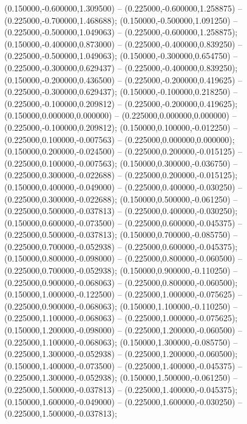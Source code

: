  (0.150000,-0.600000,1.309500) -- (0.225000,-0.600000,1.258875) -- (0.225000,-0.700000,1.468688);
 (0.150000,-0.500000,1.091250) -- (0.225000,-0.500000,1.049063) -- (0.225000,-0.600000,1.258875);
 (0.150000,-0.400000,0.873000) -- (0.225000,-0.400000,0.839250) -- (0.225000,-0.500000,1.049063);
 (0.150000,-0.300000,0.654750) -- (0.225000,-0.300000,0.629437) -- (0.225000,-0.400000,0.839250);
 (0.150000,-0.200000,0.436500) -- (0.225000,-0.200000,0.419625) -- (0.225000,-0.300000,0.629437);
 (0.150000,-0.100000,0.218250) -- (0.225000,-0.100000,0.209812) -- (0.225000,-0.200000,0.419625);
 (0.150000,0.000000,0.000000) -- (0.225000,0.000000,0.000000) -- (0.225000,-0.100000,0.209812);
 (0.150000,0.100000,-0.012250) -- (0.225000,0.100000,-0.007563) -- (0.225000,0.000000,0.000000);
 (0.150000,0.200000,-0.024500) -- (0.225000,0.200000,-0.015125) -- (0.225000,0.100000,-0.007563);
 (0.150000,0.300000,-0.036750) -- (0.225000,0.300000,-0.022688) -- (0.225000,0.200000,-0.015125);
 (0.150000,0.400000,-0.049000) -- (0.225000,0.400000,-0.030250) -- (0.225000,0.300000,-0.022688);
 (0.150000,0.500000,-0.061250) -- (0.225000,0.500000,-0.037813) -- (0.225000,0.400000,-0.030250);
 (0.150000,0.600000,-0.073500) -- (0.225000,0.600000,-0.045375) -- (0.225000,0.500000,-0.037813);
 (0.150000,0.700000,-0.085750) -- (0.225000,0.700000,-0.052938) -- (0.225000,0.600000,-0.045375);
 (0.150000,0.800000,-0.098000) -- (0.225000,0.800000,-0.060500) -- (0.225000,0.700000,-0.052938);
 (0.150000,0.900000,-0.110250) -- (0.225000,0.900000,-0.068063) -- (0.225000,0.800000,-0.060500);
 (0.150000,1.000000,-0.122500) -- (0.225000,1.000000,-0.075625) -- (0.225000,0.900000,-0.068063);
 (0.150000,1.100000,-0.110250) -- (0.225000,1.100000,-0.068063) -- (0.225000,1.000000,-0.075625);
 (0.150000,1.200000,-0.098000) -- (0.225000,1.200000,-0.060500) -- (0.225000,1.100000,-0.068063);
 (0.150000,1.300000,-0.085750) -- (0.225000,1.300000,-0.052938) -- (0.225000,1.200000,-0.060500);
 (0.150000,1.400000,-0.073500) -- (0.225000,1.400000,-0.045375) -- (0.225000,1.300000,-0.052938);
 (0.150000,1.500000,-0.061250) -- (0.225000,1.500000,-0.037813) -- (0.225000,1.400000,-0.045375);
 (0.150000,1.600000,-0.049000) -- (0.225000,1.600000,-0.030250) -- (0.225000,1.500000,-0.037813);
